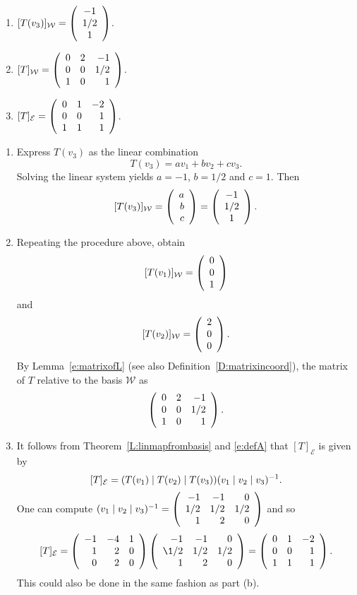 \documentclass{ximera}
\begin{document}
\begin{exercise}
\begin{solution}
\ans
\begin{enumerate}[label=(\alph*)]
\item $[T(v_3)]_\mathcal{W} = \left(\begin{array}{cccccccccccc} -1 \\ 1/2\\ 1 \end{array}\right)$.
\item $[T]_{\mathcal{W}}=\left(\begin{array}{rrrrrrrrrrrrrrrrrr}  0& 2& -1\\ 0& 0& 1/2\\ 1& 0& 1 \end{array}\right)$.
\item $[T]_{\mathcal{E}}=\left(\begin{array}{rrrrrrrrrrrrrrrrrr} 0&1&-2 \\ 0&0& 1\\ 1&1&1 \end{array}\right)$.
\end{enumerate}
\soln  
\begin{enumerate}[label=(\alph*)]
\item Express $T(v_3)$ as the linear combination 
\[
T(v_3) = a v_1 + bv_2 + cv_3.
\]
Solving the linear system yields $a=-1$, $b=1/2$ and $c=1$.  Then 
\[
[T(v_3)]_\mathcal{W} = \left(\begin{array}{rrrrrrrrrrrrrrrrrr} a\\b\\c \end{array}\right) = \left(\begin{array}{cccccccccccc} -1 \\ 1/2\\ 1 \end{array}\right)\ldotp
\]
\item Repeating the procedure above, obtain
\[
[T(v_1)]_\mathcal{W} = \left(\begin{array}{rrrrrrrrrrrrrrrrrr} 0\\0\\1 \end{array}\right)
\]
and
\[
 [T(v_2)]_{\mathcal{W}} = \left(\begin{array}{rrrrrrrrrrrrrrrrrr} 2\\0\\0 \end{array}\right)\ldotp
\]
By Lemma~\ref{e:matrixofL} (see also Definition~\ref{D:matrixincoord}), the matrix of $T$ relative to the basis $\mathcal{W}$ as
\[
\left(\begin{array}{rrrrrrrrrrrrrrrrrr}  0& 2& -1\\ 0& 0& 1/2\\ 1& 0& 1 \end{array}\right)\ldotp
\]
\item It follows from Theorem~\ref{L:linmapfrombasis} and \eqref{e:defA} that $[T]_{\mathcal{E}}$ is given by 
\[
[T]_\mathcal{E}=(T(v_1)\mid T(v_2) \mid T(v_3))(v_1\mid v_2\mid v_3)^{-1}\ldotp
\]
One can compute $(v_1\mid v_2\mid v_3)^{-1}=\left(\begin{array}{rrrrrrrrrrrrrrrrrr}  -1 & -1 & 0 \\ 1/2 & 1/2 & 1/2 \\
 1 & 2 & 0 \end{array}\right)$ and so 
 \[
 [T]_\mathcal{E}=\Matrix{ -1 & -4 & 1 \\ 1 & 2 & 0 \\ 0 & 2 & 0}\Matrix{ -1 & -1 & 0 \\ \1/2 & 1/2& 1/2 \\ 1 & 2 & 0}=\Matrix{0&1&-2 \\ 0&0& 1\\ 1&1&1}\ldotp
 \]
 This could also be done in the same fashion as part (b).
 \end{enumerate}
\end{solution}
\end{exercise}
\end{document}
